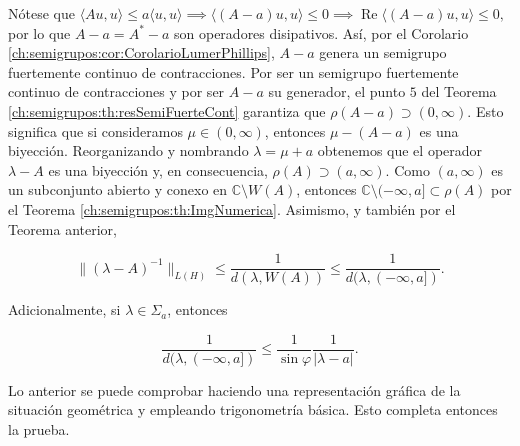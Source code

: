 Nótese que $\langle Au, u \rangle \leq a\langle u, u \rangle \implies \langle (A - a) u, u \rangle \leq 0 \implies \operatorname{Re}\langle (A - a) u, u \rangle \leq 0,$ por lo que $A-a = A^* - a$ son operadores disipativos. Así, por el Corolario \ref{ch:semigrupos:cor:CorolarioLumerPhillips}, $A-a$ genera un semigrupo fuertemente continuo de contracciones. Por ser un semigrupo fuertemente continuo de contracciones y por ser $A-a$ su generador, el punto $5$ del Teorema \ref{ch:semigrupos:th:resSemiFuerteCont} garantiza que $\rho(A-a) \supset (0, \infty)$. Esto significa que si consideramos $\mu \in (0, \infty)$, entonces $\mu - (A-a)$ es una biyección. Reorganizando y nombrando $\lambda = \mu + a$ obtenemos que el operador $\lambda - A$ es una biyección y, en consecuencia, $\rho(A) \supset (a, \infty)$. Como $(a, \infty)$ es un subconjunto abierto y conexo en $\mathbb{C} \setminus W(A)$, entonces $\mathbb{C} \setminus (-\infty, a] \subset \rho(A)$ por el Teorema \ref{ch:semigrupos:th:ImgNumerica}. Asimismo, y también por el Teorema anterior,

\[\lVert (\lambda - A)^{-1} \rVert_{L(H)} \leq \frac{1}{d(\lambda, W(A))} \leq \frac{1}{d(\lambda, (-\infty, a])}.\]

Adicionalmente, si $\lambda \in \Sigma_a$, entonces 

\[\frac{1}{d(\lambda, (-\infty, a])} \leq \frac{1}{\sin \varphi} \frac{1}{|\lambda - a|}.\]

Lo anterior se puede comprobar haciendo una representación gráfica de la situación geométrica y empleando trigonometría básica. Esto completa entonces la prueba.


